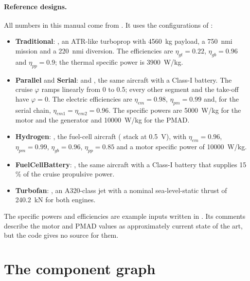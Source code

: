 \documentclass[a4paper,11pt]{article}
\begin{document}
\paragraph{Reference designs.} All numbers in this manual come from
. It uses the configurations of
:
\begin{itemize}
\item \textbf{Traditional}: , an ATR-like turboprop with
  \SI{4560}{kg} payload, a \SI{750}{nmi} mission and a \SI{220}{nmi} diversion. The
  efficiencies are $\eta_{gt} = 0.22$, $\eta_{gb} = 0.96$ and $\eta_{pp} = 0.9$; the thermal
  specific power is \SI{3900}{W/kg}.
\item \textbf{Parallel} and \textbf{Serial}:  and
  , the same aircraft with a Class-I battery. The cruise
  $\varphi$ ramps linearly from 0 to 0.5; every other segment and the take-off have
  $\varphi = 0$. The electric efficiencies are $\eta_{em} = 0.98$, $\eta_{pm} = 0.99$ and,
  for the serial chain, $\eta_{em1} = \eta_{em2} = 0.96$. The specific powers are
  \SI{5000}{W/kg} for the motor and the generator and \SI{10000}{W/kg} for the PMAD.
\item \textbf{Hydrogen}: , the fuel-cell aircraft
  ( stack at \SI{0.5}{V}), with $\eta_{em} = 0.96$,
  $\eta_{pm} = 0.99$, $\eta_{gb} = 0.96$, $\eta_{pp} = 0.85$ and a motor specific power of
  \SI{10000}{W/kg}.
\item \textbf{FuelCellBattery}: , the same aircraft with a
  Class-I battery that supplies 15\,\% of the cruise propulsive power.
\item \textbf{Turbofan}: , an A320-class jet with a nominal
  sea-level-static thrust of \SI{240.2}{kN} for both engines.
\end{itemize}
The specific powers and efficiencies are example inputs written in . Its
comments describe the motor and PMAD values as approximately current state of the art, but
the code gives no source for them.

\section{The component graph}\label{sec:graph}
\end{document}
